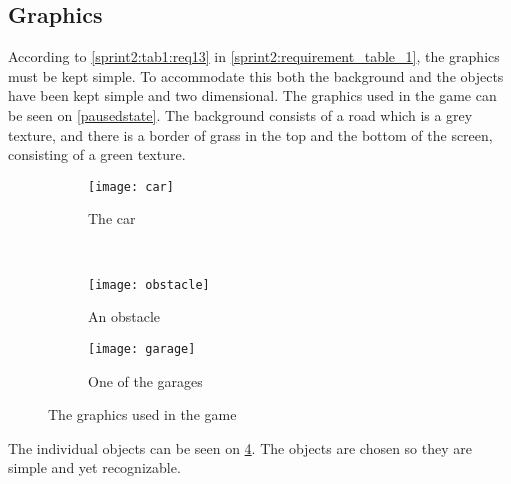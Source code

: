 \subsection{Graphics}
According to \cref{sprint2:tab1:req13} in \cref{sprint2:requirement_table_1}, the graphics must be kept simple.
To accommodate this both the background and the objects have been kept simple and two dimensional.
The graphics used in the game can be seen on \cref{pausedstate}.
The background consists of a road which is a grey texture, and there is a border of grass in the top and the bottom of the screen, consisting of a green texture.

\begin{figure}[h]
\begin{subfigure}{0.5\textwidth}
\centering
\texttt{[image: car]}
\caption{The car}
\label{car}
\end{subfigure}
~
\begin{subfigure}{0.5\textwidth}
\centering
\texttt{[image: obstacle]}
\caption{An obstacle}
\label{obstacle}
\end{subfigure}

\begin{subfigure}{\textwidth}
\centering
\texttt{[image: garage]}
\caption{One of the garages}
\label{garage}
\end{subfigure}
\caption{The graphics used in the game}
\label{graphicszoom}
\end{figure}

The individual objects can be seen on \cref{graphicszoom}.
The objects are chosen so they are simple and yet recognizable.